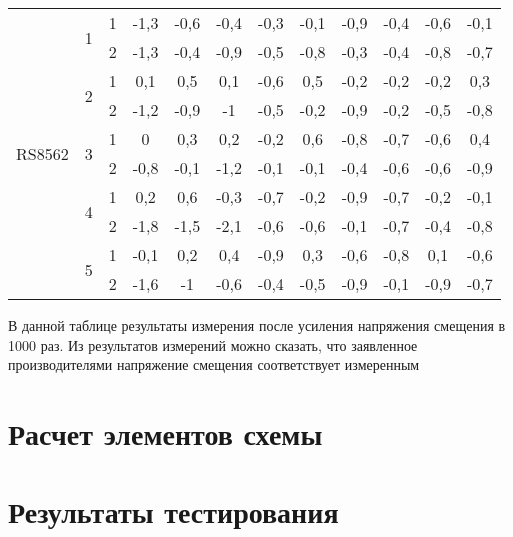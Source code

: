 \begin{table}[H]
\begin{tabular}{|c|c|c|c|c|c|c|c|c|c|c|c|}
      \hline
      \multicolumn{1}{|c|}{\multirow{10}[20]{*}{RS8562}} & \multirow{2}[4]{*}{1} & 1     & -1,3  & -0,6  & -0,4  & -0,3  & -0,1  & -0,9  & -0,4  & -0,6  & -0,1 \bigstrut\\
  \cline{3-12}          &       & 2     & -1,3  & -0,4  & -0,9  & -0,5  & -0,8  & -0,3  & -0,4  & -0,8  & -0,7 \bigstrut\\
  \cline{2-12}          & \multirow{2}[4]{*}{2} & 1     & 0,1   & 0,5   & 0,1   & -0,6  & 0,5   & -0,2  & -0,2  & -0,2  & 0,3 \bigstrut\\
  \cline{3-12}          &       & 2     & -1,2  & -0,9  & -1    & -0,5  & -0,2  & -0,9  & -0,2  & -0,5  & -0,8 \bigstrut\\
  \cline{2-12}          & \multirow{2}[4]{*}{3} & 1     & 0     & 0,3   & 0,2   & -0,2  & 0,6   & -0,8  & -0,7  & -0,6  & 0,4 \bigstrut\\
  \cline{3-12}          &       & 2     & -0,8  & -0,1  & -1,2  & -0,1  & -0,1  & -0,4  & -0,6  & -0,6  & -0,9 \bigstrut\\
  \cline{2-12}          & \multirow{2}[4]{*}{4} & 1     & 0,2   & 0,6   & -0,3  & -0,7  & -0,2  & -0,9  & -0,7  & -0,2  & -0,1 \bigstrut\\
  \cline{3-12}          &       & 2     & -1,8  & -1,5  & -2,1  & -0,6  & -0,6  & -0,1  & -0,7  & -0,4  & -0,8 \bigstrut\\
  \cline{2-12}          & \multirow{2}[4]{*}{5} & 1     & -0,1  & 0,2   & 0,4   & -0,9  & 0,3   & -0,6  & -0,8  & 0,1   & -0,6 \bigstrut\\
  \cline{3-12}          &       & 2     & -1,6  & -1    & -0,6  & -0,4  & -0,5  & -0,9  & -0,1  & -0,9  & -0,7 \bigstrut\\
      \hline
      \end{tabular}%
    \label{tab:Vcm2}%
  \end{table}
В данной таблице результаты измерения после усиления напряжения смещения в 1000 раз. Из результатов измерений
можно сказать, что заявленное производителями напряжение смещения соответствует измеренным


\section{Расчет элементов схемы}
\hspace{1cm} 

\section{Результаты тестирования}
\hspace{1cm} 